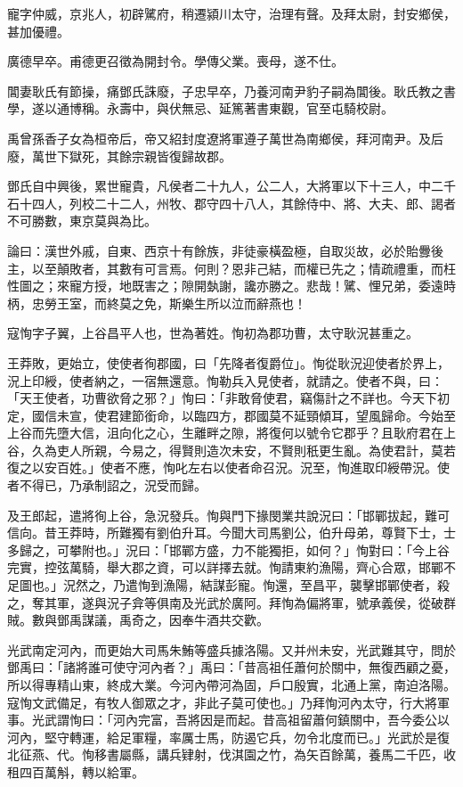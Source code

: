 \begin{pinyinscope}
寵字仲威，京兆人，初辟騭府，稍遷潁川太守，治理有聲。及拜太尉，封安鄉侯，甚加優禮。

廣德早卒。甫德更召徵為開封令。學傳父業。喪母，遂不仕。

閶妻耿氏有節操，痛鄧氏誅廢，子忠早卒，乃養河南尹豹子嗣為閶後。耿氏教之書學，遂以通博稱。永壽中，與伏無忌、延篤著書東觀，官至屯騎校尉。

禹曾孫香子女為桓帝后，帝又紹封度遼將軍遵子萬世為南鄉侯，拜河南尹。及后廢，萬世下獄死，其餘宗親皆復歸故郡。

鄧氏自中興後，累世寵貴，凡侯者二十九人，公二人，大將軍以下十三人，中二千石十四人，列校二十二人，州牧、郡守四十八人，其餘侍中、將、大夫、郎、謁者不可勝數，東京莫與為比。

論曰：漢世外戚，自東、西京十有餘族，非徒豪橫盈極，自取災故，必於貽釁後主，以至顛敗者，其數有可言焉。何則？恩非己結，而權已先之；情疏禮重，而枉性圖之；來寵方授，地既害之；隙開埶謝，讒亦勝之。悲哉！騭、悝兄弟，委遠時柄，忠勞王室，而終莫之免，斯樂生所以泣而辭燕也！

寇恂字子翼，上谷昌平人也，世為著姓。恂初為郡功曹，太守耿況甚重之。

王莽敗，更始立，使使者徇郡國，曰「先降者復爵位」。恂從耿況迎使者於界上，況上印綬，使者納之，一宿無還意。恂勒兵入見使者，就請之。使者不與，曰：「天王使者，功曹欲脅之邪？」恂曰：「非敢脅使君，竊傷計之不詳也。今天下初定，國信未宣，使君建節銜命，以臨四方，郡國莫不延頸傾耳，望風歸命。今始至上谷而先墮大信，沮向化之心，生離畔之隙，將復何以號令它郡乎？且耿府君在上谷，久為吏人所親，今易之，得賢則造次未安，不賢則秖更生亂。為使君計，莫若復之以安百姓。」使者不應，恂叱左右以使者命召況。況至，恂進取印綬帶況。使者不得已，乃承制詔之，況受而歸。

及王郎起，遣將徇上谷，急況發兵。恂與門下掾閔業共說況曰：「邯鄲拔起，難可信向。昔王莽時，所難獨有劉伯升耳。今聞大司馬劉公，伯升母弟，尊賢下士，士多歸之，可攀附也。」況曰：「邯鄲方盛，力不能獨拒，如何？」恂對曰：「今上谷完實，控弦萬騎，舉大郡之資，可以詳擇去就。恂請東約漁陽，齊心合眾，邯鄲不足圖也。」況然之，乃遣恂到漁陽，結謀彭寵。恂還，至昌平，襲擊邯鄲使者，殺之，奪其軍，遂與況子弇等俱南及光武於廣阿。拜恂為偏將軍，號承義侯，從破群賊。數與鄧禹謀議，禹奇之，因奉牛酒共交歡。

光武南定河內，而更始大司馬朱鮪等盛兵據洛陽。又并州未安，光武難其守，問於鄧禹曰：「諸將誰可使守河內者？」禹曰：「昔高祖任蕭何於關中，無復西顧之憂，所以得專精山東，終成大業。今河內帶河為固，戶口殷實，北通上黨，南迫洛陽。寇恂文武備足，有牧人御眾之才，非此子莫可使也。」乃拜恂河內太守，行大將軍事。光武謂恂曰：「河內完富，吾將因是而起。昔高祖留蕭何鎮關中，吾今委公以河內，堅守轉運，給足軍糧，率厲士馬，防遏它兵，勿令北度而已。」光武於是復北征燕、代。恂移書屬縣，講兵肄射，伐淇園之竹，為矢百餘萬，養馬二千匹，收租四百萬斛，轉以給軍。


\end{pinyinscope}
